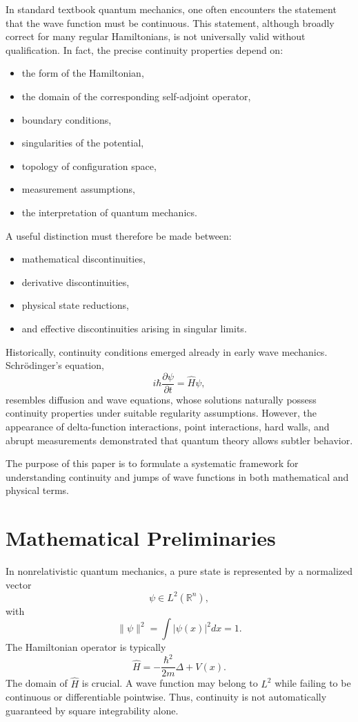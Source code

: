 \documentclass[11pt]{article}
\begin{document}
In standard textbook quantum mechanics, one often encounters the statement
that the wave function must be continuous. This statement, although broadly
correct for many regular Hamiltonians, is not universally valid without 
qualification. In fact, the precise continuity properties depend on:
\begin{itemize}
   \item the form of the Hamiltonian,
   \item the domain of the corresponding self-adjoint operator,
   \item boundary conditions,
   \item singularities of the potential,
   \item topology of configuration space,
   \item measurement assumptions,
   \item the interpretation of quantum mechanics.
\end{itemize}
A useful distinction must therefore be made between:
\begin{itemize}
   \item mathematical discontinuities,
   \item derivative discontinuities,
   \item physical state reductions,
   \item and effective discontinuities arising in singular limits.
\end{itemize}

Historically, continuity conditions emerged already in early wave 
mechanics. Schrödinger’s equation,
\[
i\hbar \frac{\partial \psi}{\partial t} = \hat H \psi,
\]
resembles diffusion and wave equations, whose solutions naturally possess 
continuity properties under suitable regularity assumptions. However, 
the appearance of delta-function interactions, point interactions, hard 
walls, and abrupt measurements demonstrated that quantum theory allows 
subtler behavior.

The purpose of this paper is to formulate a systematic framework for 
understanding continuity and jumps of wave functions in both mathematical
and physical terms.

\section{Mathematical Preliminaries}

In nonrelativistic quantum mechanics, a pure state is represented 
by a normalized vector
\[
\psi \in L^2(\mathbb R^n),
\]
with
\[
\|\psi\|^2 = \int |\psi(x)|^2 dx = 1.
\]
The Hamiltonian operator is typically
\[
\hat H = -\frac{\hbar^2}{2m}\Delta + V(x).
\]
The domain of \(\hat H\) is crucial. A wave function may belong to \(L^2\) while 
failing to be continuous or differentiable pointwise.
Thus, continuity is not automatically guaranteed by square integrability alone.
\end{document}
